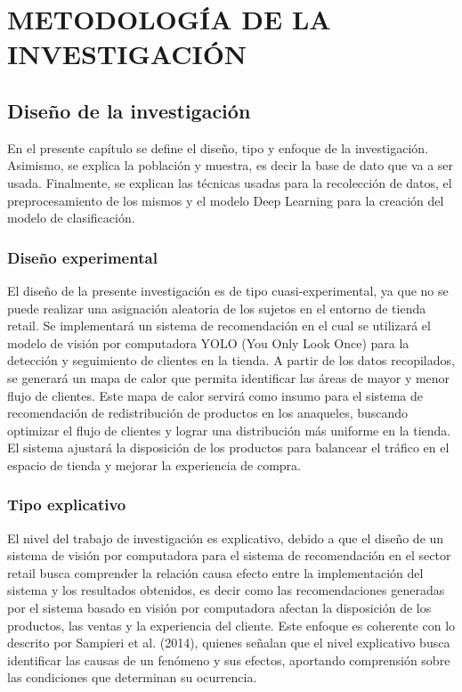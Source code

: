 \chapter{METODOLOGÍA DE LA INVESTIGACIÓN}
\section{Diseño de la investigación}
En el presente capítulo se define el diseño, tipo y enfoque de la investigación. Asimismo, se explica la población y muestra, es decir la base de dato que va a ser usada. Finalmente, se explican las técnicas usadas para la recolección de datos, el preprocesamiento de los mismos y el modelo Deep Learning para la creación del modelo de clasificación.
\subsection{Diseño experimental}
El diseño de la presente investigación es de tipo cuasi-experimental, ya que no se puede realizar una asignación aleatoria de los sujetos en el entorno de tienda retail. Se implementará un sistema de recomendación en el cual se utilizará el modelo de visión por computadora YOLO (You Only Look Once) para la detección y seguimiento de clientes en la tienda. A partir de los datos recopilados, se generará un mapa de calor que permita identificar las áreas de mayor y menor flujo de clientes. Este mapa de calor servirá como insumo para el sistema de recomendación de redistribución de productos en los anaqueles, buscando optimizar el flujo de clientes y lograr una distribución más uniforme en la tienda. El sistema ajustará la disposición de los productos para balancear el tráfico en el espacio de tienda y mejorar la experiencia de compra.

\subsection{Tipo explicativo}
El nivel del trabajo de investigación es explicativo, debido a que el diseño de un sistema de visión por computadora para el sistema de recomendación en el sector retail busca comprender la relación causa efecto entre la implementación del sistema y los resultados obtenidos, es decir como las recomendaciones generadas por el sistema basado en visión por computadora afectan la disposición de los productos, las ventas y la experiencia del cliente. Este enfoque es coherente con lo descrito por Sampieri et al. (2014), quienes señalan que el nivel explicativo busca identificar las causas de un fenómeno y sus efectos, aportando comprensión sobre las condiciones que determinan su ocurrencia.

